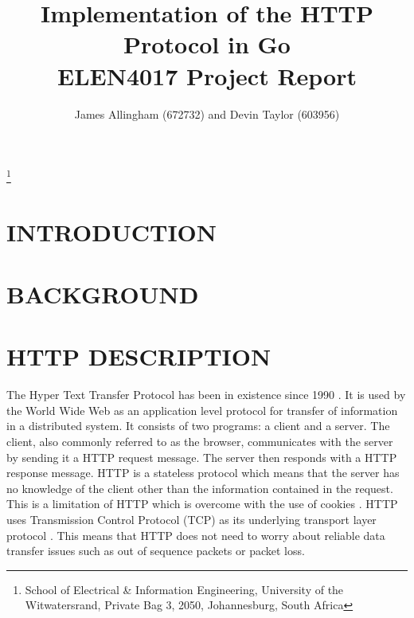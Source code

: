 \documentclass[10pt,twocolumn]{witseiepaper}
\begin{document}
\title{Implementation of the HTTP Protocol in Go \\ ELEN4017 Project Report}

\author{James Allingham (672732) and Devin Taylor (603956)}
\thanks{School of Electrical \& Information Engineering, University of the
Witwatersrand, Private Bag 3, 2050, Johannesburg, South Africa}



\abstract{}

\keywords{}


\maketitle

\section{INTRODUCTION}

\section{BACKGROUND}

\section{HTTP DESCRIPTION}

The Hyper Text Transfer Protocol has been in existence since 1990 \cite{rfc7230}. It is used by the World Wide Web as an application level protocol for transfer of information in a distributed system. It consists of two programs: a client and a server. The client, also commonly referred to as the browser, communicates with the server by sending it a HTTP request message. The server then responds with a HTTP response message. HTTP is a stateless protocol which means that the server has no knowledge of the client other than the information contained in the request. This is a limitation of HTTP which is overcome with the use of cookies \cite{kurose}. HTTP uses Transmission Control Protocol (TCP) as its underlying transport layer protocol \cite{kurose}. This means that HTTP does not need to worry about reliable data transfer issues such as out of sequence packets or packet loss.  
\end{document}
